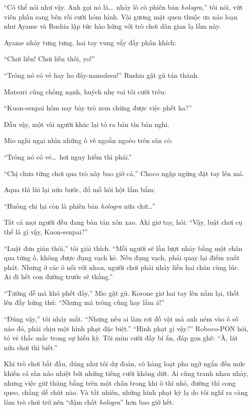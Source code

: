 \documentclass[../main.tex]{subfiles}
\begin{document}
``Có thể nói như vậy. Anh gọi nó là\dots\ nhảy lò cò phiên bản \textit{hologra},'' tôi nói, vứt viên phấn sang bên rồi cười hóm hỉnh. Vài gương mặt quen thuộc ưa náo loạn như Ayame và Rushia lập tức hào hứng với trò chơi dân gian lạ lẫm này.

Ayame nhảy tưng tưng, hai tay vung vẩy đầy phấn khích:

``Chơi liền! Chơi liền thôi, yo!''

``Trông nó có vẻ hay ho đấy-nanodesu!'' Rushia gật gù tán thành.

Matsuri cũng chống nạnh, huých nhẹ vai tôi cười trêu:

``Kuon-senpai hôm nay bày trò xem chừng được việc phết ha?''

Dẫu vậy, một vài người khác lại tỏ ra bán tín bán nghi.

Mio nghi ngại nhìn những ô vẽ ngoằn ngoèo trên sân cỏ:

``Trông nó có vẻ\dots\ hơi nguy hiểm thì phải.''

``Chị chưa từng chơi qua trò này bao giờ cả,'' Choco ngập ngừng đặt tay lên má.

Aqua thì lùi lại nửa bước, đổ mồ hôi hột lẩm bẩm:

``Huống chi lại còn là phiên bản \textit{hologra} nữa chứ\dots''

Tất cả mọi người đều đang bàn tán xôn xao. Aki giơ tay, hỏi: ``Vậy, luật chơi cụ thể là gì vậy, Kuon-senpai?''

``Luật đơn giản thôi,'' tôi giải thích. ``Mỗi người sẽ lần lượt nhảy bằng một chân qua từng ô, không được đụng vạch kẻ. Nếu đụng vạch, phải quay lại điểm xuất phát. Nhưng ở các ô nối với nhau, người chơi phải nhảy liền hai chân cùng lúc. Ai đi hết con đường trước sẽ thắng.''

``Tưởng dễ mà khó phết đấy,'' Mio gật gù. Korone giơ hai tay lên nắm lại, thốt lên đầy hứng thú: ``Nhưng mà trông cũng hay lắm á!''

``Đúng vậy,'' tôi nháy mắt. ``Nhưng nếu ai làm rơi đồ vật mà anh ném vào ô số nào đó, phải chịu một hình phạt đặc biệt.'' ``Hình phạt gì vậy?'' Roboco-PON hỏi, tỏ vẻ thắc mắc trong sự hiếu kỳ. Tôi mỉm cười đầy bí ẩn, đáp gọn ghẽ: ``À, lát nữa chơi thì biết.''

Khi trò chơi bắt đầu, đúng như tôi dự đoán, có hàng loạt pha ngớ ngẩn đến mức khiến cả sân náo nhiệt bởi những tiếng cười không dứt. Ai cũng tranh nhau nhảy, nhưng việc giữ thăng bằng trên một chân trong khi ô thì nhỏ, đường thì cong queo, chẳng dễ chút nào. Và tất nhiên, những hình phạt kỳ lạ do tôi nghĩ ra càng làm trò chơi trở nên ``đậm chất \textit{hologra}'' hơn bao giờ hết.
\end{document}
